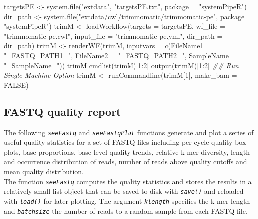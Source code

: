 \documentclass[14pt,]{article}
\newcommand{\hlnum}[1]{\textcolor[rgb]{0.816,0.125,0.439}{#1}}%
\newcommand{\hlstr}[1]{\textcolor[rgb]{0.251,0.627,0.251}{#1}}%
\newcommand{\hlcom}[1]{\textcolor[rgb]{0.502,0.502,0.502}{\textit{#1}}}%
\newcommand{\hlopt}[1]{\textcolor[rgb]{0,0,0}{#1}}%
\newcommand{\hlstd}[1]{\textcolor[rgb]{0.251,0.251,0.251}{#1}}%
\newcommand{\hlkwc}[1]{\textcolor[rgb]{0.251,0.251,0.251}{#1}}%
\newcommand{\hlkwd}[1]{\textcolor[rgb]{0.878,0.439,0.125}{#1}}%
\newenvironment{Shaded}{\begin{myshaded}}{\end{myshaded}}
\newcommand{\KeywordTok}[1]{\hlkwd{#1}}
\newcommand{\DataTypeTok}[1]{\hlkwc{#1}}
\newcommand{\DecValTok}[1]{\hlnum{#1}}
\newcommand{\StringTok}[1]{\hlstr{#1}}
\newcommand{\CommentTok}[1]{\hlcom{#1}}
\newcommand{\OtherTok}[1]{{#1}}
\newcommand{\OperatorTok}[1]{\hlopt{#1}}
\newcommand{\NormalTok}[1]{\hlstd{#1}}
\begin{document}
\begin{Shaded}
\begin{Highlighting}[]
\NormalTok{targetsPE <-}\StringTok{ }\KeywordTok{system.file}\NormalTok{(}\StringTok{"extdata"}\NormalTok{, }\StringTok{"targetsPE.txt"}\NormalTok{, }\DataTypeTok{package =} \StringTok{"systemPipeR"}\NormalTok{)}
\NormalTok{dir_path <-}\StringTok{ }\KeywordTok{system.file}\NormalTok{(}\StringTok{"extdata/cwl/trimmomatic/trimmomatic-pe"}\NormalTok{, }\DataTypeTok{package =} \StringTok{"systemPipeR"}\NormalTok{)}
\NormalTok{trimM <-}\StringTok{ }\KeywordTok{loadWorkflow}\NormalTok{(}\DataTypeTok{targets =}\NormalTok{ targetsPE, }\DataTypeTok{wf_file =} \StringTok{"trimmomatic-pe.cwl"}\NormalTok{, }\DataTypeTok{input_file =} \StringTok{"trimmomatic-pe.yml"}\NormalTok{, }
    \DataTypeTok{dir_path =}\NormalTok{ dir_path)}
\NormalTok{trimM <-}\StringTok{ }\KeywordTok{renderWF}\NormalTok{(trimM, }\DataTypeTok{inputvars =} \KeywordTok{c}\NormalTok{(}\DataTypeTok{FileName1 =} \StringTok{"_FASTQ_PATH1_"}\NormalTok{, }\DataTypeTok{FileName2 =} \StringTok{"_FASTQ_PATH2_"}\NormalTok{, }
    \DataTypeTok{SampleName =} \StringTok{"_SampleName_"}\NormalTok{))}
\NormalTok{trimM}
\KeywordTok{cmdlist}\NormalTok{(trimM)[}\DecValTok{1}\OperatorTok{:}\DecValTok{2}\NormalTok{]}
\KeywordTok{output}\NormalTok{(trimM)[}\DecValTok{1}\OperatorTok{:}\DecValTok{2}\NormalTok{]}
\CommentTok{## Run Single Machine Option}
\NormalTok{trimM <-}\StringTok{ }\KeywordTok{runCommandline}\NormalTok{(trimM[}\DecValTok{1}\NormalTok{], }\DataTypeTok{make_bam =} \OtherTok{FALSE}\NormalTok{)}
\end{Highlighting}
\end{Shaded}

\hypertarget{fastq-quality-report}{%
\subsection{FASTQ quality report}\label{fastq-quality-report}}

The following \emph{\texttt{seeFastq}} and \emph{\texttt{seeFastqPlot}} functions generate and plot a series of
useful quality statistics for a set of FASTQ files including per cycle quality
box plots, base proportions, base-level quality trends, relative k-mer
diversity, length and occurrence distribution of reads, number of reads above
quality cutoffs and mean quality distribution.\\
The function \emph{\texttt{seeFastq}} computes the quality statistics and stores the results in a
relatively small list object that can be saved to disk with \emph{\texttt{save()}} and
reloaded with \emph{\texttt{load()}} for later plotting. The argument \emph{\texttt{klength}} specifies the k-mer length and \emph{\texttt{batchsize}} the number of reads to a random sample from each
FASTQ file.
\end{document}
